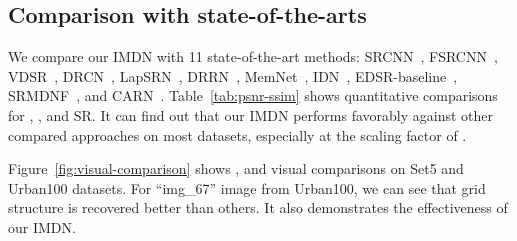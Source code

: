 \documentclass[sigconf]{acmart}
\begin{document}
\subsection{Comparison with state-of-the-arts}
We compare our IMDN with 11 state-of-the-art methods: SRCNN~\cite{SRCNN,SRCNN-Ex}, FSRCNN~\cite{FSRCNN}, VDSR~\cite{VDSR}, DRCN~\cite{DRCN}, LapSRN~\cite{LapSRN}, DRRN~\cite{DRRN}, MemNet~\cite{MemNet}, IDN~\cite{IDN}, EDSR-baseline~\cite{EDSR}, SRMDNF~\cite{SRMDNF}, and CARN~\cite{CARN}. Table~\ref{tab:psnr-ssim} shows quantitative comparisons for , , and  SR. It can find out that our IMDN performs favorably against other compared approaches on most datasets, especially at the scaling factor of . 

Figure~\ref{fig:visual-comparison} shows ,  and  visual comparisons on Set5 and Urban100 datasets. For ``img\_67'' image from Urban100, we can see that grid structure is recovered better than others. It also demonstrates the effectiveness of our IMDN.
\end{document}
